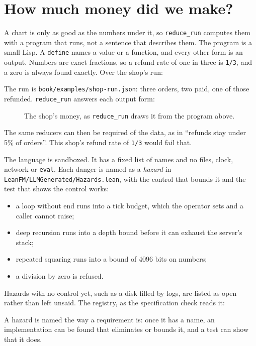 \section{How much money did we make?}

A chart is only as good as the numbers under it, so \texttt{reduce\_run} computes them with a
program that runs, not a sentence that describes them. The program is a small Lisp. A
\texttt{define} names a value or a function, and every other form is an output. Numbers are exact
fractions, so a refund rate of one in three is \texttt{1/3}, and a zero is always found exactly.
Over the shop's run:



The run is \texttt{book/examples/shop-run.json}: three orders, two paid, one of those refunded.
\texttt{reduce\_run} answers each output form:


\begin{figure}[ht]
\centering
{}
\caption{The shop's money, as \texttt{reduce\_run} draws it from the program above.}
\end{figure}

The same reducers can then be required of the data, as in ``refunds stay under 5\% of orders''.
This shop's refund rate of \texttt{1/3} would fail that.

The language is sandboxed. It has a fixed list of names and no files, clock, network or
\texttt{eval}. Each danger is named as a \emph{hazard} in
\texttt{LeanFM/LLMGenerated/Hazards.lean}, with the control that bounds it and the test that shows
the control works:
\begin{itemize}
\item a loop without end runs into a tick budget, which the operator sets and a caller cannot raise;
\item deep recursion runs into a depth bound before it can exhaust the server's stack;
\item repeated squaring runs into a bound of 4096 bits on numbers;
\item a division by zero is refused.
\end{itemize}
Hazards with no control yet, such as a disk filled by logs, are listed as open rather than left
unsaid. The registry, as the specification check reads it:

\begingroup\footnotesize

\endgroup

A hazard is named the way a requirement is: once it has a name, an implementation can be found
that eliminates or bounds it, and a test can show that it does.
